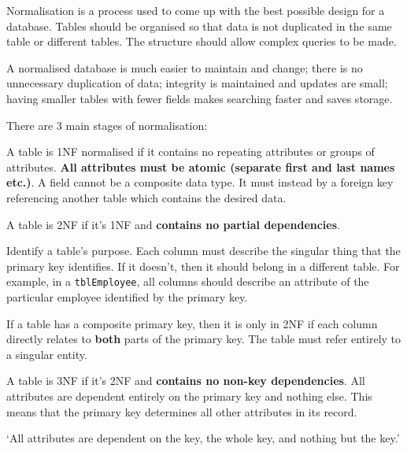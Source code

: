 \documentclass[../main.tex]{subfile}
\begin{document}

Normalisation is a process used to come up with the best possible design for a database. Tables should be organised so that data is not duplicated in the same table or different tables. The structure should allow complex queries to be made.

A normalised database is much easier to maintain and change; there is no unnecessary duplication of data; integrity is maintained and updates are small; having smaller tables with fewer fields makes searching faster and saves storage.

There are 3 main stages of normalisation:


A table is 1NF normalised if it contains no repeating attributes or groups of attributes. \textbf{All attributes must be atomic (separate first and last names etc.)}. A field cannot be a composite data type. It must instead by a foreign key referencing another table which contains the desired data.


A table is 2NF if it's 1NF and \textbf{contains no partial dependencies}.

Identify a table's purpose. Each column must describe the singular thing that the primary key identifies. If it doesn't, then it should belong in a different table. For example, in a \texttt{tblEmployee}, all columns should describe an attribute of the particular employee identified by the primary key.

If a table has a composite primary key, then it is only in 2NF if each column directly relates to \textbf{both} parts of the primary key. The table must refer entirely to a singular entity.


A table is 3NF if it's 2NF and \textbf{contains no non-key dependencies}. All attributes are dependent entirely on the primary key and nothing else. This means that the primary key determines all other attributes in its record.

\enquote*{All attributes are dependent on the key, the whole key, and nothing but the key.}
\end{document}
